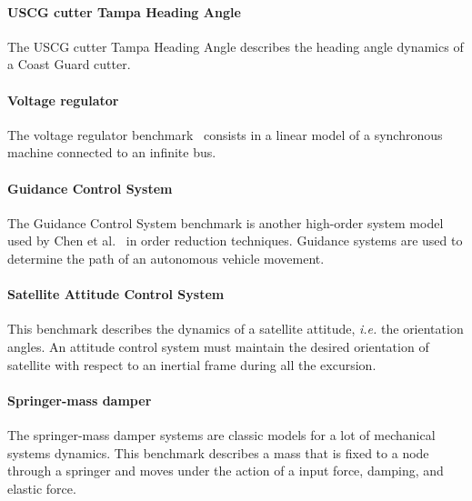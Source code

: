 \documentclass[sigconf]{llncs}
\begin{document}
{%
\paragraph*{USCG cutter Tampa Heading Angle}

The USCG cutter Tampa Heading Angle describes the heading angle 
dynamics of a Coast Guard cutter.

\paragraph*{Voltage regulator}

The voltage regulator benchmark~\cite{KOKOTOVIC198023} consists 
in a linear model of a synchronous machine connected to an 
infinite bus.
\paragraph*{Guidance Control System}

The Guidance Control System benchmark is another high-order system 
model used by Chen et al.~\cite{CHEN1979389}  in order reduction 
techniques. Guidance systems are used to determine the path of an 
autonomous vehicle movement.

\paragraph*{Satellite Attitude Control System}

This benchmark describes the dynamics of a satellite attitude, 
{\it i.e.} the orientation angles. An attitude control system must 
maintain the desired orientation of satellite with respect to an 
inertial frame during all the excursion. 

\paragraph*{Springer-mass damper}

The springer-mass damper systems are classic models for a lot of 
mechanical systems dynamics. This benchmark describes a mass that is 
fixed to a node through a springer and moves under the action of a 
input force, damping, and elastic force.

}
\end{document}
